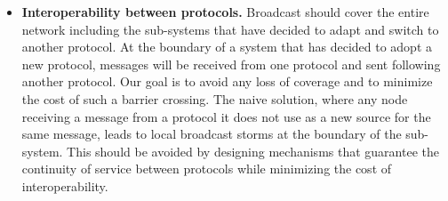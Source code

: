 \begin{itemize}
	\item \textbf{Interoperability between protocols.}
	Broadcast should cover the entire network including the sub-systems that have decided to adapt and switch to another protocol.
	At the boundary of a system that has decided to adopt a new protocol, messages will be received from one protocol and sent following another protocol.
	Our goal is to avoid any loss of coverage and to minimize the cost of such a barrier crossing.
	The naive solution, where any node receiving a message from a protocol it does not use as a new source for the same message, leads to local broadcast storms at the boundary of the sub-system.
	This should be avoided by designing mechanisms that guarantee the continuity of service between protocols while minimizing the cost of interoperability.
	
\end{itemize}
